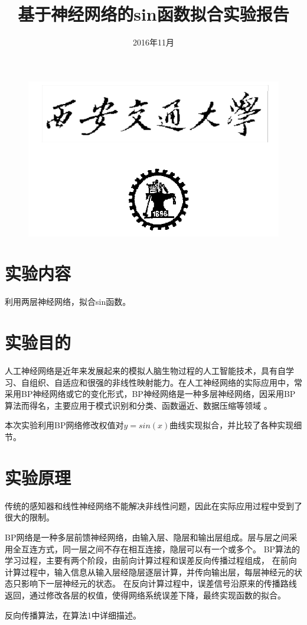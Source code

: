 \documentclass{article}
\date{2016年11月}
\title{基于神经网络的sin函数拟合实验报告}
\begin{document}
\begin{CJK}{UTF8}{gkai}
\begin{figure}
\centering
\includegraphics[width=0.6\linewidth]{xjtu}
\end{figure}


\maketitle
\clearpage
\section{实验内容}
利用两层神经网络，拟合sin函数。
\section{实验目的}
人工神经网络是近年来发展起来的模拟人脑生物过程的人工智能技术，具有自学习、自组织、自适应和很强的非线性映射能力。在人工神经网络的实际应用中，常采用BP神经网络或它的变化形式，BP神经网络是一种多层神经网络，因采用BP算法而得名，主要应用于模式识别和分类、函数逼近、数据压缩等领域 \cite{bao2010} 。  

本次实验利用BP网络修改权值对$y=sin(x)$曲线实现拟合，并比较了各种实现细节。

\section{实验原理}
传统的感知器和线性神经网络不能解决非线性问题，因此在实际应用过程中受到了很大的限制。

BP网络是一种多层前馈神经网络，由输入层、隐层和输出层组成。层与层之间采用全互连方式，同一层之间不存在相互连接，隐层可以有一个或多个。
BP算法的学习过程，主要有两个阶段，由前向计算过程和误差反向传播过程组成，
在前向计算过程中，输入信息从输入层经隐层逐层计算，并传向输出层，每层神经元的状态只影响下一层神经元的状态。
在反向计算过程中，误差信号沿原来的传播路线返回，通过修改各层的权值，使得网络系统误差下降，最终实现函数的拟合。

反向传播算法，在算法1中详细描述。


\end{CJK}
\end{document}
